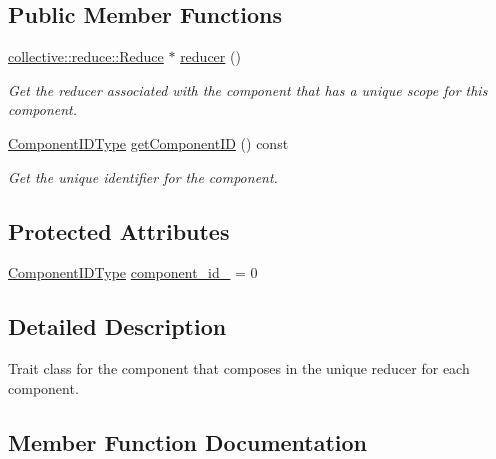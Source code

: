 \subsection*{Public Member Functions}
\begin{DoxyCompactItemize}
\item 
\hyperlink{structvt_1_1collective_1_1reduce_1_1_reduce}{collective\+::reduce\+::\+Reduce} $\ast$ \hyperlink{structvt_1_1runtime_1_1component_1_1_component_reducer_af9d694f9d62d973a2cde6e52c55bef14}{reducer} ()
\begin{DoxyCompactList}\small\item\em Get the reducer associated with the component that has a unique scope for this component. \end{DoxyCompactList}\item 
\hyperlink{namespacevt_ab6ac935c168b809c422d5121da4f2700}{Component\+I\+D\+Type} \hyperlink{structvt_1_1runtime_1_1component_1_1_component_reducer_a45ab90398777ffdbb2ad5b62fe183d99}{get\+Component\+ID} () const
\begin{DoxyCompactList}\small\item\em Get the unique identifier for the component. \end{DoxyCompactList}\end{DoxyCompactItemize}
\subsection*{Protected Attributes}
\begin{DoxyCompactItemize}
\item 
\hyperlink{namespacevt_ab6ac935c168b809c422d5121da4f2700}{Component\+I\+D\+Type} \hyperlink{structvt_1_1runtime_1_1component_1_1_component_reducer_ac9c39c6eafc72a1a240ed67ea12b3e66}{component\+\_\+id\+\_\+} = 0
\end{DoxyCompactItemize}


\subsection{Detailed Description}
Trait class for the component that composes in the unique reducer for each component. 

\subsection{Member Function Documentation}
\mbox{\label{structvt_1_1runtime_1_1component_1_1_component_reducer_a45ab90398777ffdbb2ad5b62fe183d99}} 
